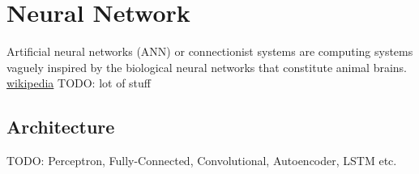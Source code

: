 \chapter{Neural Network}
Artificial neural networks (ANN) or connectionist systems are computing systems vaguely inspired by the biological neural networks that constitute animal brains.
\href{https://en.wikipedia.org/wiki/Artificial_neural_network}{wikipedia}
TODO: lot of stuff

\section{Architecture}
TODO: Perceptron, Fully-Connected, Convolutional, Autoencoder, LSTM etc.

\newcommand{\activationDec}[6]{
\subsection{#1}
#2
\begin{samepage}
\begin{tabular}{ l | r }
    \Centering definition & \Centering{derivative} \\\hline
    $f(x) = #3$ & $f'(x)=#4$\\
\end{tabular}\\
\begin{tikzpicture}
    \begin{axis}[
        xmin=-3, xmax=3,
        ymin=-3, ymax=3,
        ytick={-3,-2,...,3},
        cycle list name=color-scheme,
        axis lines = left,
        extra x ticks={0},
        extra y ticks={0},
        extra tick style={grid=major},
        every axis plot/.append style={ultra thick}
    ]
    #6
    \addlegendentry{$f'(x)$}
    #5
    \addlegendentry{$f(x)$}
     
    \end{axis}
\end{tikzpicture}
\end{samepage}
\filbreak
}
\newcommand{\activation}[5]{
    \activationDec{#1}{}{#2}{#3}{#4}{#5}
}

\newcommand{\activationsimple}[5]{
    \activation{#1}{#2}{#3}{
        \addplot [
            domain=-3:3, 
            samples=100, 
            color=SchoolColor
        ]
        {(#4)};
    }
    {
        \addplot [
            domain=-3:3, 
            samples=100, 
            color=matching1
        ]
        {(#5)};
    }
}

